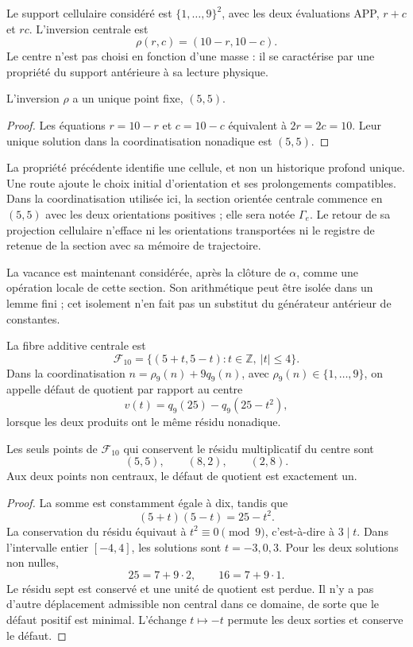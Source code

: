 Le support cellulaire considéré est \(\{1,\ldots,9\}^2\), avec les deux
évaluations APP, \(r+c\) et \(rc\). L'inversion centrale est
\begin{equation}
 \rho(r,c)=(10-r,10-c).
 \label{eq:el-inversion-central}
\end{equation}
Le centre n'est pas choisi en fonction d'une masse : il se caractérise par une propriété du
support antérieure à sa lecture physique.

\begin{proposition}
L'inversion \(\rho\) a un unique point fixe, \((5,5)\).
\end{proposition}
\begin{proof}
Les équations \(r=10-r\) et \(c=10-c\) équivalent à
\(2r=2c=10\). Leur unique solution dans la coordinatisation nonadique est \((5,5)\).
\end{proof}

La propriété précédente identifie une cellule, et non un historique profond
unique. Une route ajoute le choix initial d'orientation et ses
prolongements compatibles. Dans la coordinatisation utilisée ici, la section
orientée centrale commence en \((5,5)\) avec les deux orientations
positives ; elle sera notée \(\Gamma_e\). Le retour de sa projection
cellulaire n'efface ni les orientations transportées ni le registre de
retenue de la section avec sa mémoire de trajectoire.

La vacance est maintenant considérée, après la clôture de \(\alpha\), comme
une opération locale de cette section. Son arithmétique peut être isolée dans un
lemme fini ; cet isolement n'en fait pas un substitut du
générateur antérieur de constantes.

\begin{definition}
La fibre additive centrale est
\[
 \mathcal F_{10}
 =\{(5+t,5-t):t\in\mathbb Z,\ |t|\leq4\}.
\]
Dans la coordinatisation \(n=\rho_9(n)+9q_9(n)\), avec
\(\rho_9(n)\in\{1,\ldots,9\}\), on appelle défaut de quotient par rapport
au centre
\[
 v(t)=q_9(25)-q_9(25-t^2),
\]
lorsque les deux produits ont le même résidu nonadique.
\end{definition}

\begin{lemma}
Les seuls points de \(\mathcal F_{10}\) qui conservent le résidu
multiplicatif du centre sont
\[
 (5,5),\qquad (8,2),\qquad (2,8).
\]
Aux deux points non centraux, le défaut de quotient est exactement un.
\end{lemma}
\begin{proof}
La somme est constamment égale à dix, tandis que
\[
 (5+t)(5-t)=25-t^2.
\]
La conservation du résidu équivaut à \(t^2\equiv0\pmod9\), c'est-à-dire à \(3\mid t\). Dans l'intervalle entier \([-4,4]\), les solutions sont \(t=-3,0,3\). Pour les deux solutions non nulles,
\[
 25=7+9\cdot2,\qquad16=7+9\cdot1.
\]
Le résidu sept est conservé et une unité de quotient est perdue. Il n'y a
pas d'autre déplacement admissible non central dans ce domaine, de sorte que le
défaut positif est minimal. L'échange \(t\mapsto-t\) permute les
deux sorties et conserve le défaut.
\end{proof}

